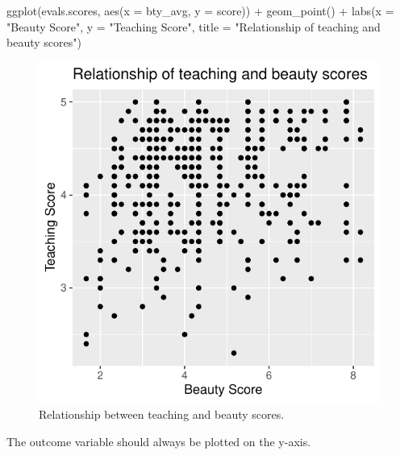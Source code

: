 \documentclass[
  letterpaper,
  DIV=11,
  numbers=noendperiod]{scrartcl}
\newenvironment{Shaded}{\begin{snugshade}}{\end{snugshade}}
\newcommand{\AttributeTok}[1]{\textcolor[rgb]{0.40,0.45,0.13}{#1}}
\newcommand{\FunctionTok}[1]{\textcolor[rgb]{0.28,0.35,0.67}{#1}}
\newcommand{\NormalTok}[1]{\textcolor[rgb]{0.00,0.23,0.31}{#1}}
\newcommand{\SpecialCharTok}[1]{\textcolor[rgb]{0.37,0.37,0.37}{#1}}
\newcommand{\StringTok}[1]{\textcolor[rgb]{0.13,0.47,0.30}{#1}}
\begin{document}
\begin{Shaded}
\begin{Highlighting}[]
\FunctionTok{ggplot}\NormalTok{(evals.scores, }\FunctionTok{aes}\NormalTok{(}\AttributeTok{x =}\NormalTok{ bty\_avg, }\AttributeTok{y =}\NormalTok{ score)) }\SpecialCharTok{+}
  \FunctionTok{geom\_point}\NormalTok{() }\SpecialCharTok{+}
  \FunctionTok{labs}\NormalTok{(}\AttributeTok{x =} \StringTok{"Beauty Score"}\NormalTok{, }\AttributeTok{y =} \StringTok{"Teaching Score"}\NormalTok{, }\AttributeTok{title =} \StringTok{"Relationship of teaching and beauty scores"}\NormalTok{)}
\end{Highlighting}
\end{Shaded}

\begin{figure}[H]

{\centering \includegraphics{index_files/figure-pdf/unnamed-chunk-4-1.pdf}

}

\caption{Relationship between teaching and beauty scores.}

\end{figure}%

\begin{tcolorbox}[enhanced jigsaw, colbacktitle=quarto-callout-note-color!10!white, colback=white, breakable, bottomtitle=1mm, opacityback=0, coltitle=black, title=\textcolor{quarto-callout-note-color}{\faInfo}\hspace{0.5em}{Note}, titlerule=0mm, colframe=quarto-callout-note-color-frame, leftrule=.75mm, toprule=.15mm, toptitle=1mm, arc=.35mm, bottomrule=.15mm, rightrule=.15mm, left=2mm, opacitybacktitle=0.6]

The outcome variable should always be plotted on the y-axis.

\end{tcolorbox}
\end{document}
